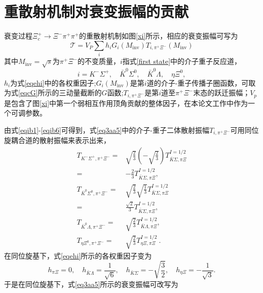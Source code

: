 \section{重散射机制对衰变振幅的贡献}
\label{sec33}
衰变过程$\Xi_{c}^{+}\to\Xi^{-}\pi^{+}\pi^{+}$的重散射机制如图\ref{xi}所示，相应的衰变振幅可写为
\begin{equation}
	\label{eq3aa5}
	\mathcal{T}=V_{P}\sum_{i}h_{i}G_{i}(M_{\text{inv}})T_{i,\pi^{+}\Xi^{-}}(M_{\text{inv}})
\end{equation}
其中$M_{\text{inv}}=\sqrt{s}$为$\pi^+\Xi^-$的不变质量，$i$指式\eqref{first state}中的介子重子反应道，
\begin{equation}
	i=K^{-}\Sigma^{+},\quad \bar{K}^{0}\Sigma^{0},\quad \bar{K}^{0}\Lambda,\quad \eta\Xi^{0},
\end{equation}
$h_i$为式\eqref{eqehi}中的各权重因子;\;$G_i(M_{\text{inv}})$是第$i$道的介子-重子传播子圈函数，可取为式\eqref{eqcG}所示的三动量截断的$G$函数;\;$T_{i,\pi^+\Xi^-}$是第$i$道至$\pi^+\Xi^-$末态的跃迁振幅；$V_p$是包含了图\ref{xi}中第一个弱相互作用顶角贡献的整体因子，在本论文工作中作为一个可调参数。\par
由式\eqref{eqib1}-\eqref{eqib6}可得到，式\eqref{eq3aa5}中的介子-重子二体散射振幅$T_{i,\pi^{+}\Xi^{-}}$可用同位旋耦合道的散射振幅来表示出来，
\begin{equation}
\begin{split}
	T_{K^{-}\Sigma^{+},\pi^{+}\Xi^{-}}=&\sqrt{\frac{2}{3}}\left(-\sqrt{\frac{2}{3}}\right)T_{\bar{K}\Sigma,\pi\Xi}^{I={1}/{2}}\\[1ex]
	=&-\frac{2}{3}T_{\bar{K}\Sigma,\pi\Xi}^{I=1/2},\\[1ex]
	T_{\bar{K}^{0}\Sigma^{0},\pi^{+}\Xi^{-}}=&\sqrt{\frac{2}{3}}\sqrt{\frac{1}{3}}T_{\bar{K}\Sigma,\pi\Xi}^{I=1/2}\\[1ex]
	=&\frac{\sqrt{2}}{3}T_{\bar{K}\Sigma,\pi\Xi}^{I=1/2},\\[1ex]
	T_{\bar{K}^{0}\Lambda,\pi^{+}\Xi^{-}}=&\sqrt{\frac{2}{3}}T_{\bar{K}\Lambda,\pi\Xi}^{I=1/2},\\[1ex]
	T_{\eta\Xi^{0},\pi^{+}\Xi^{-}}=&\sqrt{\frac{2}{3}}T_{\eta\Xi,\pi\Xi}^{I=1/2}\ .
\end{split}
\end{equation}
在同位旋基下，式\eqref{eqehi}所示的各权重因子变为
\begin{equation}
	h_{\pi\Xi}=0,\quad h_{\bar{K}\Lambda}=\frac{1}{\sqrt{6}},\quad h_{\bar{K}\Sigma}=-\sqrt{\frac{3}{2}},\quad h_{\eta\Xi}=-\frac{1}{\sqrt{3}}.
\end{equation}
于是在同位旋基下，式\eqref{eq3aa5}所示的衰变振幅可改写为
